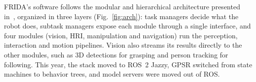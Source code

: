 FRIDA's software follows the modular and hierarchical architecture presented in~\cite{floresramirez2026toolkit}, organized in three layers (Fig.~\ref{fig:arch}): task managers decide what the robot does, subtask managers expose each module through a single interface, and four modules (vision, HRI, manipulation and navigation) run the perception, interaction and motion pipelines. Vision also streams its results directly to the other modules, such as 3D detections for grasping and person tracking for following. This year, the stack moved to ROS~2 Jazzy, GPSR switched from state machines to behavior trees, and model servers were moved out of ROS.

